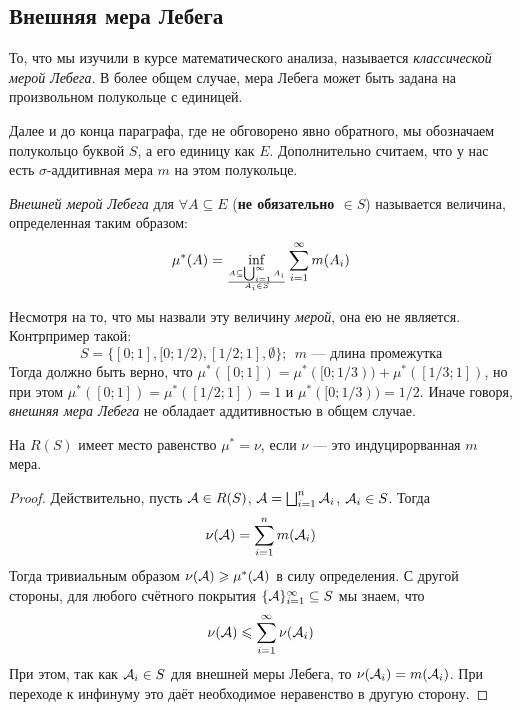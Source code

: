 \subsection{Внешняя мера Лебега}

\begin{note}
	То, что мы изучили в курсе математического анализа, называется \textit{классической мерой Лебега}. В более общем случае, мера Лебега может быть задана на произвольном полукольце с единицей.
\end{note}

\begin{note}
	Далее и до конца параграфа, где не обговорено явно обратного, мы обозначаем полукольцо буквой $S$, а его единицу как $E$. Дополнительно считаем, что у нас есть $\sigma$-аддитивная мера $m$ на этом полукольце.
\end{note}

\begin{definition}
	\textit{Внешней мерой Лебега} для $\forall A \subseteq E$ (\textbf{не обязательно $\in S$}) называется величина, определенная таким образом:
	\[
		\mu^*(A) = \inf_{A \subseteq \bigcup_{i = 1}^\infty A_i \over A_i \in S} \sum_{i = 1}^\infty m(A_i)
	\]
\end{definition}

\begin{note}
	Несмотря на то, что мы назвали эту величину \textit{мерой}, она ею не является. Контрпример такой:
	\[
		S = \{[0; 1], [0; 1/2), [1/2; 1], \emptyset\};\ \ m \text{ --- длина промежутка}
	\]
	Тогда должно быть верно, что $\mu^*([0; 1]) = \mu^*([0; 1/3)) + \mu^*([1/3; 1])$, но при этом $\mu^*([0; 1]) = \mu^*([1/2; 1]) = 1$ и $\mu^*([0; 1/3)) = 1/2$. Иначе говоря, \textit{внешняя мера Лебега} не обладает аддитивностью в общем случае.
\end{note}

\begin{proposition}
	На $R(S)$ имеет место равенство $\mu^* = \nu$, если $\nu$ --- это индуцирорванная $m$ мера.
\end{proposition}

\begin{proof}
	Действительно, пусть $\mathcal{A} \in R(S)$, $\mathcal{A} = \bigsqcup_{i = 1}^n \mathcal{A}_i$, $\mathcal{A}_i \in S$. Тогда
	\[
		\nu(\mathcal{A}) = \sum_{i = 1}^n m(\mathcal{A}_i)
	\]
	Тогда тривиальным образом $\nu(\mathcal{A}) \geqslant \mu^*(\mathcal{A})$ в силу определения. С другой стороны, для любого счётного покрытия $\{\mathcal{A}\}_{i = 1}^\infty \subseteq S$ мы знаем, что
	\[
		\nu(\mathcal{A}) \leqslant \sum_{i = 1}^\infty \nu(\mathcal{A}_i)
	\]
	При этом, так как $\mathcal{A}_i \in S$ для внешней меры Лебега, то $\nu(\mathcal{A}_i) = m(\mathcal{A}_i)$. При переходе к инфинуму это даёт необходимое неравенство в другую сторону.
\end{proof}

